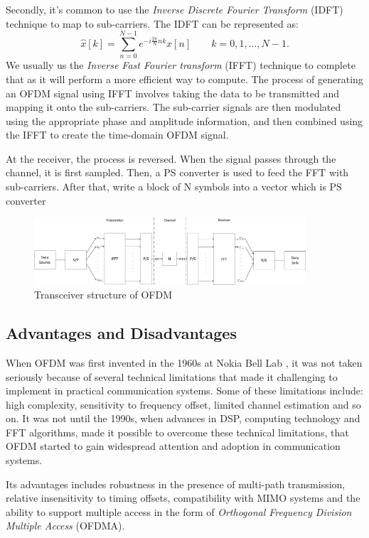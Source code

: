 \documentclass[10pt]{article}
\numberwithin{figure}{section}
\numberwithin{equation}{section}
\begin{document}
Secondly, it's common to use the \textit{Inverse Discrete Fourier Transform} (IDFT) technique to map to sub-carriers. The IDFT can be represented as: 
\begin{equation}
\hat{x}[k]=\sum_{n=0}^{N-1} e^{-i\frac{2\pi}{N}nk}x[n] \qquad k = 0,1,\ldots,N-1. \label{con:idft}
\end{equation}
We usually us the \textit{Inverse Fast Fourier transform} (IFFT) technique to complete that as it will perform a more efficient way to compute. The process of generating an OFDM signal using IFFT involves taking the data to be transmitted and mapping it onto the sub-carriers. The sub-carrier signals are then modulated using the appropriate phase and amplitude information, and then combined using the IFFT to create the time-domain OFDM signal. 

At the receiver, the process is reversed. When the signal passes through the channel, it is first sampled. Then, a PS converter is used to feed the FFT with sub-carriers. After that, write a block of N symbols into a vector which is PS converter
\begin{figure}[!ht]
    \centering
    \includegraphics[width=0.9\textwidth]{images/OFDM_transceiver.pdf}
    \caption{Transceiver structure of OFDM}
    \label{fig:Transceiver structure}
\end{figure}
\subsection{Advantages and Disadvantages}
When OFDM was first invented in the 1960s at Nokia Bell Lab \cite{RN82}, it was not taken seriously because of several technical limitations that made it challenging to implement in practical communication systems. Some of these limitations include: high complexity, sensitivity to frequency offset, limited channel estimation and so on. It was not until the 1990s, when advances in DSP, computing technology and FFT algorithms, made it possible to overcome these technical limitations, that OFDM started to gain widespread attention and adoption in communication systems. 

Its advantages includes robustness in the presence of multi-path transmission, relative insensitivity to timing offsets, compatibility with MIMO systems and the ability to support multiple access in the form of \textit{Orthogonal Frequency Division Multiple Access} (OFDMA). 
\end{document}
